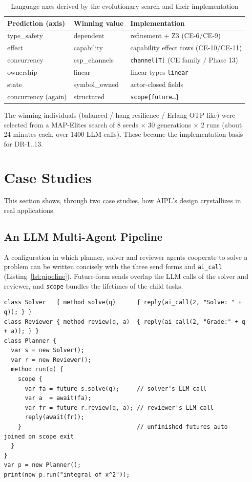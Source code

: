 \documentclass[11pt,a4paper]{article}
\newcommand{\code}[1]{\texttt{\small #1}}
\begin{document}
\begin{table}[h]
\centering\small
\caption{Language axes derived by the evolutionary search and their implementation}\label{tab:evo}
\begin{tabularx}{\linewidth}{@{}l l X@{}}
\toprule
Prediction (axis) & Winning value & Implementation \\
\midrule
type\_safety & dependent & refinement + Z3 (CE-6/CE-9) \\
effect & capability & capability effect rows (CE-10/CE-11) \\
concurrency & csp\_channels & \code{channel[T]} (CE family / Phase 13) \\
ownership & linear & linear types \code{linear} \\
state & symbol\_owned & actor-closed fields \\
concurrency (again) & structured & \code{scope\{future\dots\}} \\
\bottomrule
\end{tabularx}
\end{table}

The winning individuals (balanced / hang-resilience / Erlang-OTP-like)
were selected from a MAP-Elites search of 8 seeds $\times$ 30 generations
$\times$ 2 runs (about 24 minutes each, over 1400 LLM calls). These
became the implementation basis for DR-1..13.

\section{Case Studies}\label{sec:case}
This section shows, through two case studies, how AIPL's design
crystallizes in real applications.

\subsection{An LLM Multi-Agent Pipeline}
A configuration in which planner, solver and reviewer agents cooperate to
solve a problem can be written concisely with the three send forms and
\code{ai\_call} (Listing~\ref{lst:pipeline}). Future-form sends overlap
the LLM calls of the solver and reviewer, and \code{scope} bundles the
lifetimes of the child tasks.

\begin{lstlisting}[caption={planner→solver→reviewer cooperation},label={lst:pipeline},float=h]
class Solver   { method solve(q)      { reply(ai_call(2, "Solve: " + q)); } }
class Reviewer { method review(q, a)  { reply(ai_call(2, "Grade:" + q + a)); } }
class Planner {
  var s = new Solver();
  var r = new Reviewer();
  method run(q) {
    scope {
      var fa = future s.solve(q);     // solver's LLM call
      var a  = await(fa);
      var fr = future r.review(q, a); // reviewer's LLM call
      reply(await(fr));
    }                                 // unfinished futures auto-joined on scope exit
  }
}
var p = new Planner();
print(now p.run("integral of x^2"));
\end{lstlisting}
\end{document}
